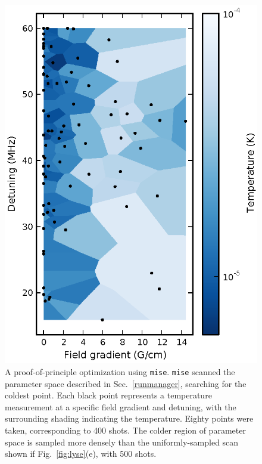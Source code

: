 \begin{figure}%
\includegraphics{figures/software/mise_plot.eps}%
\caption{
A proof-of-principle optimization using \texttt{mise}.
\texttt{mise} scanned the parameter space described in Sec.~\ref{runmanager}, searching for the coldest point.
Each black point represents a temperature measurement at a specific field gradient and detuning, with the surrounding shading indicating the temperature.
Eighty points were taken, corresponding to 400 shots.
The colder region of parameter space is sampled more densely than the uniformly-sampled scan shown if Fig.~\ref{fig:lyse}(e), with 500 shots.
}%
\label{fig:mise_result}%
\end{figure}


